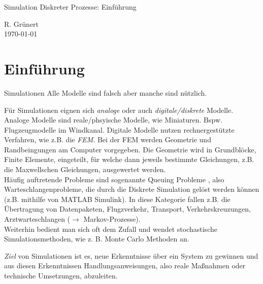 \documentclass[11pt, a4paper]{article}
\begin{document}
\begin{center}
  \Large{Simulation Diskreter Prozesse: Einführung}
\end{center}

\begin{flushright}
  R. Grünert\\
  \today
\end{flushright}

\section{Einführung}
\begin{zitat}{Simulationen}
  Alle Modelle sind falsch aber manche sind nützlich.
\end{zitat}

Für Simulationen eignen sich \emph{analoge} oder auch \emph{digitale/diskrete} Modelle. Analoge Modelle sind reale/phsyische Modelle, wie Miniaturen. Bspw. Flugzeugmodelle im Windkanal.
Digitale Modelle nutzen rechnergestützte Verfahren, wie z.B. die \emph{FEM}. Bei der FEM werden Geometrie und Randbeingungen am Computer vorgegeben. Die Geometrie wird in Grundblöcke, \glqq Finite Elemente\grqq, eingeteilt, für welche dann jeweils bestimmte Gleichungen, z.B. die Maxwellschen Gleichungen, ausgewertet werden.\\

Häufig auftretende Probleme sind sogenannte \glqq Queuing Probleme \grqq, also Warteschlangenprobleme, die durch die Diskrete Simulation gelöst werden können (z.B. mithilfe von MATLAB Simulink). In diese Kategorie fallen z.B. die Übertragung von Datenpaketen, Flugzverkehr, Transport, Verkehrskreuzungen, Arztwarteschlangen ($\rightarrow$ Markov-Prozesse).\\

Weiterhin bedient man sich oft dem Zufall und wendet stochastische Simulationsmethoden, wie z. B. \glqq Monte Carlo \grqq Methoden an.


\emph{Ziel} von Simulationen ist es, neue Erkenntnisse über ein System zu gewinnen und aus diesen Erkenntnissen Handlungsanweisungen, also reale Maßnahmen oder technische Umsetzungen, abzuleiten.
\end{document}
